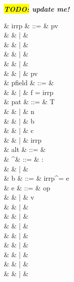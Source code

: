 \documentclass[a4paper]{article}
\newcommand{\TODO}[1]{\textbf{\textsl{\colorbox{yellow}{TODO:} #1}}}
\newcommand{\todo}[1]{\TODO{#1}}
\begin{document}
\todo{update me!}

{
\small
\begin{grammar}
   & irrp & ::= & pv \\
                        &      & |   &  \\
                        &      & |   &  \\
                        &      & |   & \sWILDCARD \\
                        &      & |   & \sunit \\
                        &      & |   & pv\  \\
   & pfield & ::= & \sALLFIELDS \\
                       &        & |   & f = irrp \\
   & pat & ::= & T\  \\
                 &     & |   & n\\
                 &     & |   & b\\
                 &     & |   & c\\
                 &     & |   & irrp\\
   & alt & ::= & \\
   & \cdot^\tau & ::= & \cdot : \tau \\
                         &          & |   & \cdot \\
   & b & ::= & irrp^\tau = e\ \sBANG {} \\
   & e & ::= & op\  \\
                    &   & |   & v \\
                    &   & |   &  \\
                    &   & |   &  \\
                    &   & |   &  \\
                    &   & |   &  \\
                    &   & |   &  \\
                    &   & |   &  \\
                    &   & |   &  \\
                    &   & |   & \sunit \\

\end{grammar}}
\end{document}
